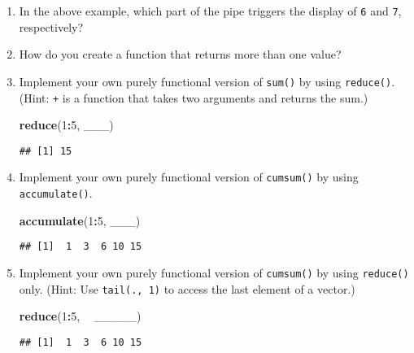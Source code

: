 \documentclass[]{book}
\newenvironment{Shaded}{\begin{snugshade}}{\end{snugshade}}
\newcommand{\DecValTok}[1]{\textcolor[rgb]{0.00,0.00,0.81}{#1}}
\newcommand{\KeywordTok}[1]{\textcolor[rgb]{0.13,0.29,0.53}{\textbf{#1}}}
\newcommand{\NormalTok}[1]{#1}
\newcommand{\OperatorTok}[1]{\textcolor[rgb]{0.81,0.36,0.00}{\textbf{#1}}}
\newcommand{\StringTok}[1]{\textcolor[rgb]{0.31,0.60,0.02}{#1}}
\begin{document}
\begin{enumerate}
\def\labelenumi{\arabic{enumi}.}
\item
  In the above example, which part of the pipe triggers the display of \texttt{6} and \texttt{7}, respectively?
\item
  How do you create a function that returns more than one value?
\item
  Implement your own purely functional version of \texttt{sum()} by using \texttt{reduce()}. (Hint: \texttt{\textasciigrave{}+\textasciigrave{}} is a function that takes two arguments and returns the sum.)

\begin{Shaded}
\begin{Highlighting}[]
\KeywordTok{reduce}\NormalTok{(}\DecValTok{1}\OperatorTok{:}\DecValTok{5}\NormalTok{, ___)}
\end{Highlighting}
\end{Shaded}

\begin{verbatim}
## [1] 15
\end{verbatim}
\item
  Implement your own purely functional version of \texttt{cumsum()} by using \texttt{accumulate()}.

\begin{Shaded}
\begin{Highlighting}[]
\KeywordTok{accumulate}\NormalTok{(}\DecValTok{1}\OperatorTok{:}\DecValTok{5}\NormalTok{, ___)}
\end{Highlighting}
\end{Shaded}

\begin{verbatim}
## [1]  1  3  6 10 15
\end{verbatim}
\item
  Implement your own purely functional version of \texttt{cumsum()} by using \texttt{reduce()} only. (Hint: Use \texttt{tail(.,\ 1)} to access the last element of a vector.)

\begin{Shaded}
\begin{Highlighting}[]
\KeywordTok{reduce}\NormalTok{(}\DecValTok{1}\OperatorTok{:}\DecValTok{5}\NormalTok{, }\OperatorTok{~}\StringTok{ }\NormalTok{_____)}
\end{Highlighting}
\end{Shaded}

\begin{verbatim}
## [1]  1  3  6 10 15
\end{verbatim}
\end{enumerate}
\end{document}
